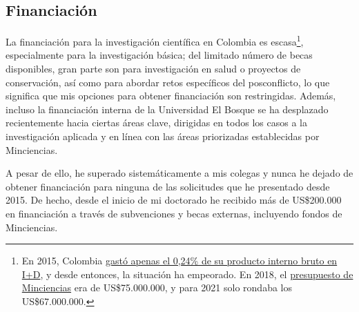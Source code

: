\documentclass[11pt,a4paper,]{awesome-cv}
\begin{document}
\hypertarget{financiaciuxf3n}{%
\subsection{Financiación}\label{financiaciuxf3n}}

\begin{footnotesize}
La financiación para la investigación científica en Colombia es escasa\footnote{En 2015, Colombia \href{https://www.science.org/content/article/researchers-thought-peace-colombia-would-mean-more-science-funding-they-were-wrong}{gastó apenas el 0,24\% de su producto interno bruto en I+D}, y desde entonces, la situación ha empeorado. En 2018, el \href{https://www-infobae-com.translate.goog/america/colombia/2021/09/03/congresistas-piden-incrementar-el-presupuesto-de-minciencia-para-2022/?_x_tr_sl=es&_x_tr_tl=en}{presupuesto de Minciencias} era de US\$75.000.000, y para 2021 solo rondaba los US\$67.000.000.}, especialmente para la investigación básica; del limitado número de becas disponibles, gran parte son para investigación en salud o proyectos de conservación, así como para abordar retos específicos del posconflicto, lo que significa que mis opciones para obtener financiación son restringidas. Además, incluso la financiación interna de la Universidad El Bosque se ha desplazado recientemente hacia ciertas áreas clave, dirigidas en todos los casos a la investigación aplicada y en línea con las áreas priorizadas establecidas por Minciencias.

A pesar de ello, he superado sistemáticamente a mis colegas y nunca he dejado de obtener financiación para ninguna de las solicitudes que he presentado desde 2015. De hecho, desde el inicio de mi doctorado he recibido más de US\$200.000 en financiación a través de subvenciones y becas externas, incluyendo fondos de Minciencias.
\end{footnotesize}
\end{document}
